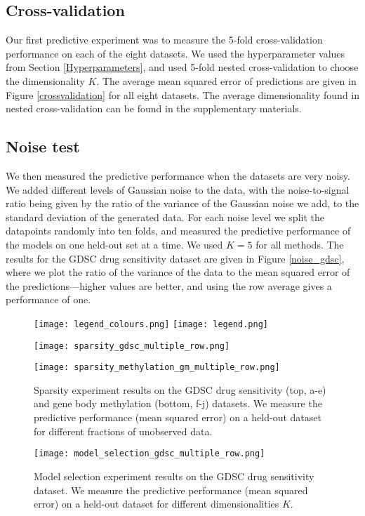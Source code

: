 \documentclass[letterpaper]{article} %
\begin{document}
	
	\subsection{Cross-validation} \label{Cross-validation}
		Our first predictive experiment was to measure the 5-fold cross-validation performance on each of the eight datasets. We used the hyperparameter values from Section \ref{Hyperparameters}, and used 5-fold nested cross-validation to choose the dimensionality $K$. The average mean squared error of predictions are given in Figure \ref{crossvalidation} for all eight datasets. The average dimensionality found in nested cross-validation can be found in the supplementary materials.
		
	\subsection{Noise test}
		We then measured the predictive performance when the datasets are very noisy. We added different levels of Gaussian noise to the data, with the noise-to-signal ratio being given by the ratio of the variance of the Gaussian noise we add, to the standard deviation of the generated data. For each noise level we split the datapoints randomly into ten folds, and measured the predictive performance of the models on one held-out set at a time.  We used $K=5$ for all methods. The results for the GDSC drug sensitivity dataset are given in Figure \ref{noise_gdsc}, where we plot the ratio of the variance of the data to the mean squared error of the predictions---higher values are better, and using the row average gives a performance of one. 
		
		\begin{figure*}[t]
			\centering
			\texttt{[image: legend\_colours.png]}
			\vspace{5pt}
			\texttt{[image: legend.png]}
			\vspace{5pt}
			\begin{minipage}{\textwidth}
				\texttt{[image: sparsity\_gdsc\_multiple\_row.png]}
				
				\texttt{[image: sparsity\_methylation\_gm\_multiple\_row.png]}
				\caption{Sparsity experiment results on the GDSC drug sensitivity (top, a-e) and gene body methylation (bottom, f-j) datasets. We measure the predictive performance (mean squared error) on a held-out dataset for different fractions of unobserved data.}
				\label{sparsity_gm_gdsc}
			\end{minipage}
			\begin{minipage}{\textwidth}
				\texttt{[image: model\_selection\_gdsc\_multiple\_row.png]}
				\caption{Model selection experiment results on the GDSC drug sensitivity dataset. We measure the predictive performance (mean squared error) on a held-out dataset for different dimensionalities $K$.}
				\label{model_selection_gdsc}
			\end{minipage}
		\end{figure*}
	
\end{document}
